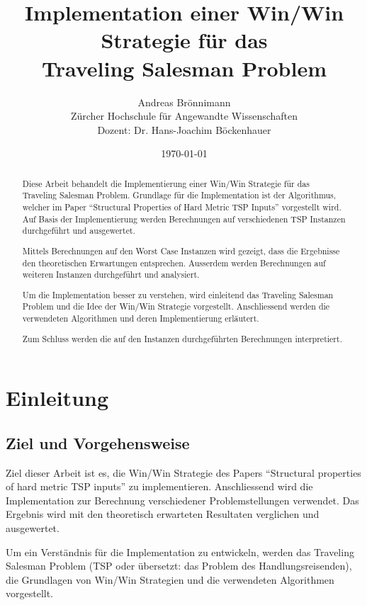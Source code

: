 \documentclass[11pt,a4paper]{article}
\title {Implementation einer Win/Win Strategie für das \\
Traveling Salesman Problem}
\author {Andreas Brönnimann\\
Zürcher Hochschule für Angewandte Wissenschaften\\
Dozent: Dr. Hans-Joachim Böckenhauer}
\date {\today}
\begin{document}
\nocite{*}

\maketitle
\setcounter{page}{0}
\thispagestyle{empty}
\newpage

\begin{abstract}
    Diese Arbeit behandelt die Implementierung einer Win/Win Strategie für das Traveling Salesman Problem. Grundlage für die Implementation ist der Algorithmus, welcher im Paper "`Structural Properties of Hard Metric TSP Inputs"'\cite{moemke11} vorgestellt wird. Auf Basis der Implementierung werden Berechnungen auf verschiedenen TSP Instanzen durchgeführt und ausgewertet.

    Mittels Berechnungen auf den Worst Case Instanzen wird gezeigt, dass die Ergebnisse den theoretischen Erwartungen entsprechen. Ausserdem werden Berechnungen auf weiteren Instanzen durchgeführt und analysiert.

Um die Implementation  besser zu verstehen, wird einleitend das Traveling Salesman Problem und die Idee der Win/Win Strategie vorgestellt. Anschliessend werden die verwendeten Algorithmen und deren Implementierung erläutert.

Zum Schluss werden die auf den Instanzen durchgeführten Berechnungen interpretiert.
\end{abstract}

\newpage

\tableofcontents
\newpage
\section{Einleitung}
\subsection{Ziel und Vorgehensweise}
Ziel dieser Arbeit ist es, die Win/Win Strategie des Papers "`Structural properties of hard metric TSP inputs"'\cite{moemke11} zu implementieren. Anschliessend wird die Implementation zur Berechnung verschiedener Problemstellungen verwendet. Das Ergebnis wird mit den theoretisch erwarteten Resultaten verglichen und ausgewertet.

Um ein Verständnis für die Implementation zu entwickeln, werden das Traveling Salesman Problem (TSP oder übersetzt: das Problem des Handlungsreisenden), die Grundlagen von Win/Win Strategien und die verwendeten Algorithmen vorgestellt. 
\end{document}
